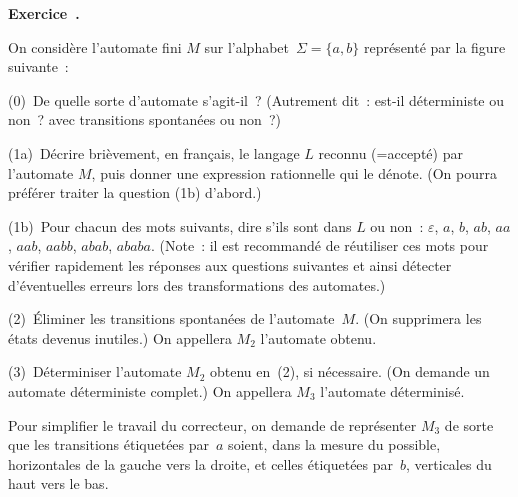 \documentclass[12pt,a4paper]{article}
\theoremstyle{definition}
\newcommand\exercice{%
\refstepcounter{comcnt}\bigskip\noindent\textbf{Exercice~\thecomcnt.}}
\begin{document}
%

\exercice

On considère l'automate fini $M$ sur l'alphabet $\Sigma = \{a,b\}$
représenté par la figure suivante :
\begin{center}
\end{center}

(0) De quelle sorte d'automate s'agit-il ?  (Autrement dit : est-il
déterministe ou non ? avec transitions spontanées ou non ?)

(1a) Décrire brièvement, en français, le langage $L$ reconnu
(=accepté) par l'automate $M$, puis donner une expression
rationnelle qui le dénote.  (On pourra préférer traiter la question
(1b) d'abord.)

(1b) Pour chacun des mots suivants, dire s'ils sont dans $L$ ou non :
$\varepsilon$, $a$, $b$, $ab$, $aa$, $aab$, $aabb$, $abab$, $ababa$.
(Note : il est recommandé de réutiliser ces mots pour vérifier
rapidement les réponses aux questions suivantes et ainsi détecter
d'éventuelles erreurs lors des transformations des automates.)

(2) Éliminer les transitions spontanées de l'automate $M$.  (On
supprimera les états devenus inutiles.)  On appellera $M_2$ l'automate
obtenu.

(3) Déterminiser l'automate $M_2$ obtenu en (2), si nécessaire.  (On
demande un automate déterministe complet.)  On appellera $M_3$
l'automate déterminisé.

Pour simplifier le travail du correcteur, on demande de représenter
$M_3$ de sorte que les transitions étiquetées par $a$ soient, dans la
mesure du possible, horizontales de la gauche vers la droite, et
celles étiquetées par $b$, verticales du haut vers le bas.
\end{document}

